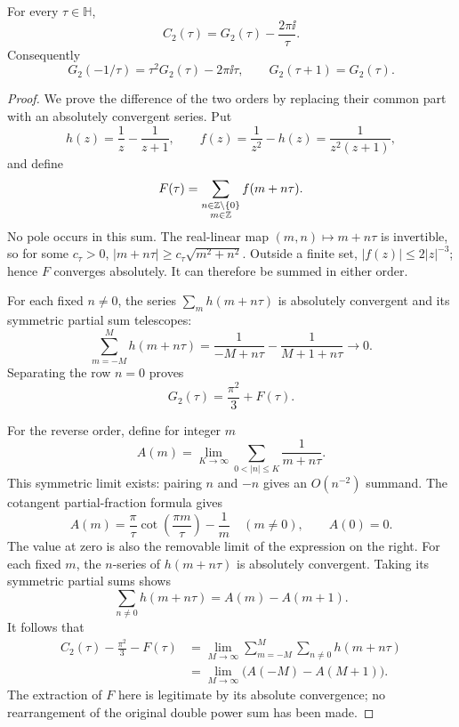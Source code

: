 \begin{theorem}
\label{thm:modular-ordering}
For every \(\tau\in\mathbb H\),
\begin{equation}
C_2(\tau)=G_2(\tau)-\frac{2\pi\ii}{\tau}.
\label{eq:modular-anomaly}
\end{equation}
Consequently
\begin{equation}
G_2(-1/\tau)=\tau^2G_2(\tau)-2\pi\ii\tau,
\qquad G_2(\tau+1)=G_2(\tau).
\label{eq:modular-G2-transform}
\end{equation}
\end{theorem}

\begin{proof}
We prove the difference of the two orders by replacing their common
part with an absolutely convergent series. Put
\[
h(z)=\frac1z-\frac1{z+1},\qquad
f(z)=\frac1{z^2}-h(z)=\frac1{z^2(z+1)},
\]
and define
\[
F(\tau)=\sum_{\substack{n\in\mathbb{Z}\setminus\{0\}\\m\in\mathbb{Z}}}
                    f(m+n\tau).
\]
No pole occurs in this sum. The real-linear map
\((m,n)\mapsto m+n\tau\) is invertible, so for some \(c_\tau>0\),
\(|m+n\tau|\ge c_\tau\sqrt{m^2+n^2}\).
Outside a finite set, \(|f(z)|\le2|z|^{-3}\); hence \(F\) converges
absolutely. It can therefore be summed in either order.

For each fixed \(n\ne0\), the series \(\sum_m h(m+n\tau)\) is
absolutely convergent and its symmetric partial sum telescopes:
\[
\sum_{m=-M}^{M}h(m+n\tau)
=\frac1{-M+n\tau}-\frac1{M+1+n\tau}\longrightarrow0.
\]
Separating the row \(n=0\) proves
\begin{equation}
G_2(\tau)=\frac{\pi^2}{3}+F(\tau).
\label{eq:modular-G2-absolute-part}
\end{equation}

For the reverse order, define for integer \(m\)
\[
A(m)=\lim_{K\to\infty}
              \sum_{0<|n|\le K}\frac1{m+n\tau}.
\]
This symmetric limit exists: pairing \(n\) and \(-n\) gives an
\(O(n^{-2})\) summand. The cotangent partial-fraction formula gives
\begin{equation}
A(m)=\frac{\pi}{\tau}\cot\!\left(\frac{\pi m}{\tau}\right)-\frac1m
\quad(m\ne0),\qquad A(0)=0.
\label{eq:modular-A-cotangent}
\end{equation}
The value at zero is also the removable limit of the expression on
the right. For each fixed \(m\), the \(n\)-series of \(h(m+n\tau)\)
is absolutely convergent. Taking its symmetric partial sums shows
\[
\sum_{n\ne0}h(m+n\tau)=A(m)-A(m+1).
\]
It follows that
\begin{align*}
C_2(\tau)-\frac{\pi^2}{3}-F(\tau)
&=\lim_{M\to\infty}\sum_{m=-M}^{M}\sum_{n\ne0}h(m+n\tau)\\
&=\lim_{M\to\infty}\bigl(A(-M)-A(M+1)\bigr).
\end{align*}
The extraction of \(F\) here is legitimate by its absolute
convergence; no rearrangement of the original double power sum has
been made.


\end{proof}
